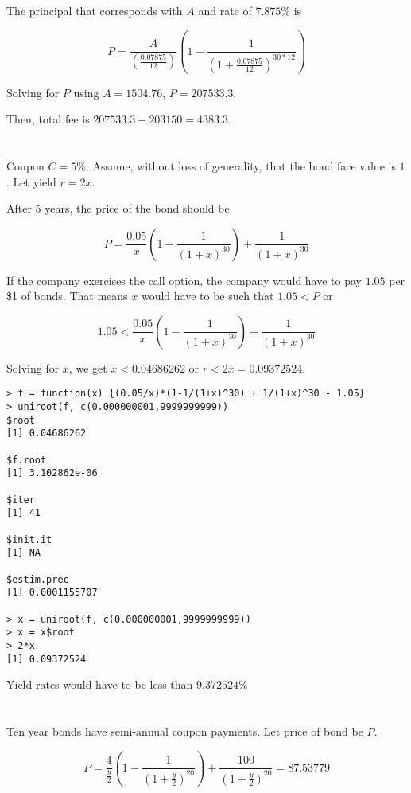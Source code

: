 \documentclass[11pt]{scrartcl}
\begin{document}
The principal that corresponds with $A$ and rate of $7.875\%$ is

\[P = \frac{A}{\left( \frac{0.07875}{12} \right)} \left(1 - \frac{1}{\left(1+\frac{0.07875}{12}\right)^{30*12}} \right)\]

Solving for $P$ using $A = 1504.76$, $P = 207533.3$.

Then, total fee is $207533.3 - 203150 = 4383.3$.

\section{}

Coupon $C = 5\%$. Assume, without loss of generality, that the bond face value is $1$. Let yield $r = 2x$.

After 5 years, the price of the bond should be 

\[P = \frac{0.05}{x} \left(1 - \frac{1}{(1 + x)^{30}} \right) + \frac{1}{(1+x)^{30}}\]

If the company exercises the call option, the company would have to pay $1.05$ per \$1 of bonds. That means $x$ would have to be such that $1.05 < P$ or

\[1.05 < \frac{0.05}{x} \left(1 - \frac{1}{(1 + x)^{30}} \right) + \frac{1}{(1+x)^{30}}\]

Solving for $x$, we get $x < 0.04686262$ or $r < 2x = 0.09372524$.

\begin{lstlisting}
> f = function(x) {(0.05/x)*(1-1/(1+x)^30) + 1/(1+x)^30 - 1.05}
> uniroot(f, c(0.000000001,9999999999))
$root
[1] 0.04686262

$f.root
[1] 3.102862e-06

$iter
[1] 41

$init.it
[1] NA

$estim.prec
[1] 0.0001155707

> x = uniroot(f, c(0.000000001,9999999999))
> x = x$root
> 2*x
[1] 0.09372524
\end{lstlisting}

Yield rates would have to be less than $9.372524\%$

\section{}

Ten year bonds have semi-annual coupon payments. Let price of bond be $P$.

\[P = \frac{4}{\frac{y}{2}} \left( 1 - \frac{1}{(1+\frac{y}{2})^{20}}\right) + \frac{100}{(1+\frac{y}{2})^{20}} = 87.53779\]
\end{document}
